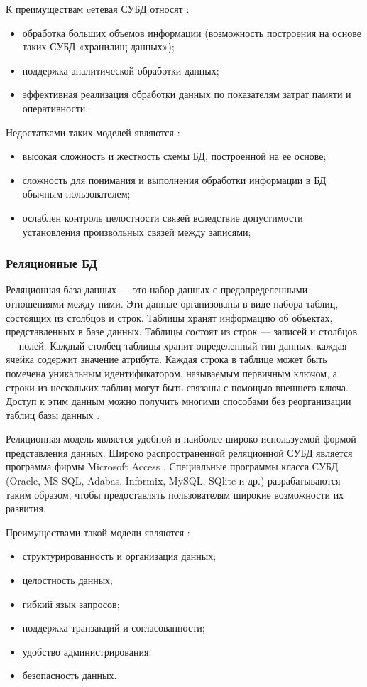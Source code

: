 К преимуществам cетевая СУБД относят \cite{setevaya}:
\begin{itemize}
	\item обработка больших объемов информации (возможность построения на основе таких СУБД «хранилищ данных»);
	\item поддержка аналитической обработки данных;
	\item эффективная реализация обработки данных по показателям затрат памяти и оперативности.
\end{itemize}

Недостатками таких моделей являются \cite{setevaya}:
\begin{itemize}
	\item высокая сложность и жесткость схемы БД, построенной на ее основе;
	\item сложность для понимания и выполнения обработки информации в БД обычным пользователем;
	\item ослаблен контроль целостности связей вследствие допустимости установления произвольных связей между записями;
\end{itemize}

\subsubsection{Реляционные БД}
Реляционная база данных --- это набор данных с предопределенными отношениями между ними.
Эти данные организованы в виде набора таблиц, состоящих из столбцов и строк.
Таблицы хранят информацию об объектах, представленных в базе данных.
Таблицы состоят из строк --- записей и столбцов --- полей.
Каждый столбец таблицы хранит определенный тип данных, каждая ячейка содержит значение атрибута.
Каждая строка в таблице может быть помечена уникальным идентификатором, называемым первичным ключом, а строки из нескольких таблиц могут быть связаны с помощью внешнего
ключа.
Доступ к этим данным можно получить многими способами без реорганизации таблиц базы данных \cite{relation}.

Реляционная модель является удобной и наиболее широко используемой формой представления данных.
Широко распространенной реляционной СУБД является программа фирмы Microsoft Access \cite{instument}. Специальные программы класса СУБД (Oracle, MS SQL, Adabas, Informix, MySQL, SQlite и
др.) разрабатываются таким образом, чтобы предоставлять пользователям широкие возможности их развития.

Преимуществами такой модели являются \cite{relation2}:
\begin{itemize}
	\item структурированность и организация данных;
	\item целостность данных;
	\item гибкий язык запросов;
	\item поддержка транзакций и согласованности;
	\item удобство администрирования;
	\item безопасность данных.
\end{itemize}

